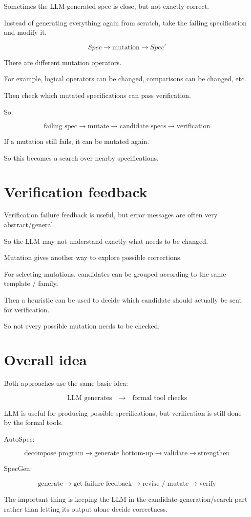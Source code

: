 \documentclass[11pt]{book}
\begin{document}
Sometimes the LLM-generated spec is close,
but not exactly correct.

Instead of generating everything again from scratch,
take the failing specification and modify it.

\[
Spec
\rightarrow
\text{mutation}
\rightarrow
Spec'
\]

There are different mutation operators.

For example, logical operators can be changed,
comparisons can be changed, etc.

Then check which mutated specifications can
pass verification.

So:

\[
\text{failing spec}
\rightarrow
\text{mutate}
\rightarrow
\text{candidate specs}
\rightarrow
\text{verification}
\]

If a mutation still fails, it can be mutated again.

So this becomes a search over nearby specifications.

\section{Verification feedback}

Verification failure feedback is useful,
but error messages are often very abstract/general.

So the LLM may not understand exactly what needs
to be changed.

Mutation gives another way to explore possible
corrections.

For selecting mutations, candidates can be grouped
according to the same template / family.

Then a heuristic can be used to decide which
candidate should actually be sent for verification.

So not every possible mutation needs to be checked.

\section{Overall idea}

Both approaches use the same basic idea:

\begin{ppkey}
\[
\boxed{
\text{LLM generates}
\quad\rightarrow\quad
\text{formal tool checks}
}
\]

LLM is useful for producing possible specifications,
but verification is still done by the formal tools.
\end{ppkey}

AutoSpec:

\[
\text{decompose program}
\rightarrow
\text{generate bottom-up}
\rightarrow
\text{validate}
\rightarrow
\text{strengthen}
\]

SpecGen:

\[
\text{generate}
\rightarrow
\text{get failure feedback}
\rightarrow
\text{revise / mutate}
\rightarrow
\text{verify}
\]

The important thing is keeping the LLM in the
candidate-generation/search part rather than
letting its output alone decide correctness.
\end{document}

